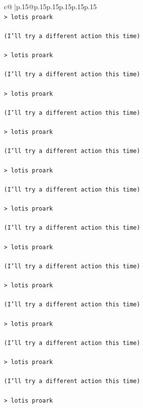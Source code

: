 \documentclass{article}
\begin{document}
{\begin{supertabular}{c@{$\;$}|p{.15\linewidth}@{}p{.15\linewidth}p{.15\linewidth}p{.15\linewidth}p{.15\linewidth}p{.15\linewidth}}
{{{\\ 
\texttt{> lotis proark } \\
\\ 
\texttt{(I'll try a different action this time) } \\
\\ 
\texttt{> lotis proark } \\
\\ 
\texttt{(I'll try a different action this time) } \\
\\ 
\texttt{> lotis proark } \\
\\ 
\texttt{(I'll try a different action this time) } \\
\\ 
\texttt{> lotis proark } \\
\\ 
\texttt{(I'll try a different action this time) } \\
\\ 
\texttt{> lotis proark } \\
\\ 
\texttt{(I'll try a different action this time) } \\
\\ 
\texttt{> lotis proark } \\
\\ 
\texttt{(I'll try a different action this time) } \\
\\ 
\texttt{> lotis proark } \\
\\ 
\texttt{(I'll try a different action this time) } \\
\\ 
\texttt{> lotis proark } \\
\\ 
\texttt{(I'll try a different action this time) } \\
\\ 
\texttt{> lotis proark } \\
\\ 
\texttt{(I'll try a different action this time) } \\
\\ 
\texttt{> lotis proark } \\
\\ 
\texttt{(I'll try a different action this time) } \\
\\ 
\texttt{> lotis proark } \\
}}}
\end{supertabular}}
\end{document}
